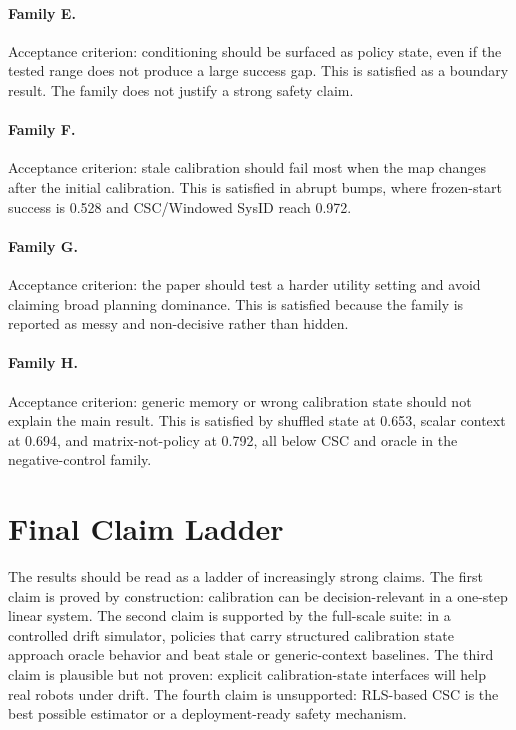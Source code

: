 \documentclass{article}
\begin{document}
\paragraph{Family E.}
Acceptance criterion: conditioning should be surfaced as policy state, even if
the tested range does not produce a large success gap. This is satisfied as a
boundary result. The family does not justify a strong safety claim.

\paragraph{Family F.}
Acceptance criterion: stale calibration should fail most when the map changes
after the initial calibration. This is satisfied in abrupt bumps, where
frozen-start success is 0.528 and CSC/Windowed SysID reach 0.972.

\paragraph{Family G.}
Acceptance criterion: the paper should test a harder utility setting and avoid
claiming broad planning dominance. This is satisfied because the family is
reported as messy and non-decisive rather than hidden.

\paragraph{Family H.}
Acceptance criterion: generic memory or wrong calibration state should not
explain the main result. This is satisfied by shuffled state at 0.653, scalar
context at 0.694, and matrix-not-policy at 0.792, all below CSC and oracle in
the negative-control family.

\section{Final Claim Ladder}

The results should be read as a ladder of increasingly strong claims. The
first claim is proved by construction: calibration can be decision-relevant in
a one-step linear system. The second claim is supported by the full-scale
suite: in a controlled drift simulator, policies that carry structured
calibration state approach oracle behavior and beat stale or generic-context
baselines. The third claim is plausible but not proven: explicit
calibration-state interfaces will help real robots under drift. The fourth
claim is unsupported: RLS-based CSC is the best possible estimator or a
deployment-ready safety mechanism.
\end{document}

